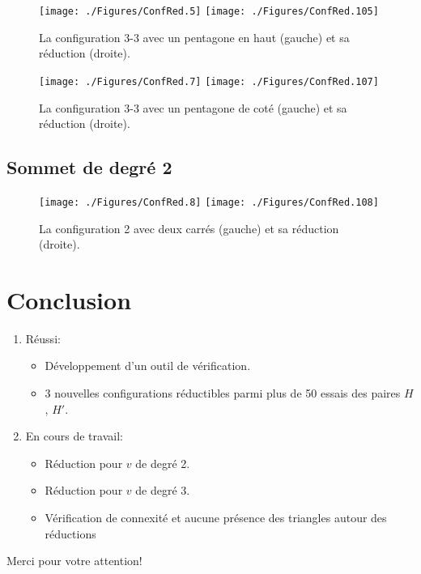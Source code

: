 \documentclass{beamer}
\begin{document}
\begin{frame}
\begin{figure}[ht]
\centerline{
\texttt{[image: ./Figures/ConfRed.5]}
\hfil
\texttt{[image: ./Figures/ConfRed.105]}
}
\caption{La configuration 3-3 avec un pentagone en haut (gauche) et sa réduction (droite).}
\label{fig:33PH}
\end{figure}
\end{frame}

\begin{frame}
\begin{figure}[ht]
\centerline{
\texttt{[image: ./Figures/ConfRed.7]}
\hfil
\texttt{[image: ./Figures/ConfRed.107]}
}
\caption{La configuration 3-3 avec un pentagone de coté (gauche) et sa réduction (droite).}
\label{fig:33PC}
\end{figure}
\end{frame}

\subsection{Sommet de degré 2}
\begin{frame}
\begin{figure}[ht]
\centerline{
\texttt{[image: ./Figures/ConfRed.8]}
\hfil
\texttt{[image: ./Figures/ConfRed.108]}
}
\caption{La configuration 2 avec deux carrés (gauche) et sa réduction (droite).}
\label{fig:2CC}
\end{figure}
\end{frame}


\section{Conclusion}
\begin{frame}
\begin{enumerate}
\item Réussi:
\begin{itemize}
\item Développement d'un outil de vérification.
\item 3 nouvelles configurations réductibles parmi plus de 50 essais des paires $H$, $H'$.
\end{itemize}
\item En cours de travail:
\begin{itemize}
\item Réduction pour $v$ de degré 2.
\item Réduction pour $v$ de degré 3.
\item Vérification de connexité et aucune présence des triangles autour des réductions
\end{itemize}
\end{enumerate}

\end{frame}

\begin{frame}
\begin{center}
Merci pour votre attention!
\end{center}
\end{frame}
\end{document}

